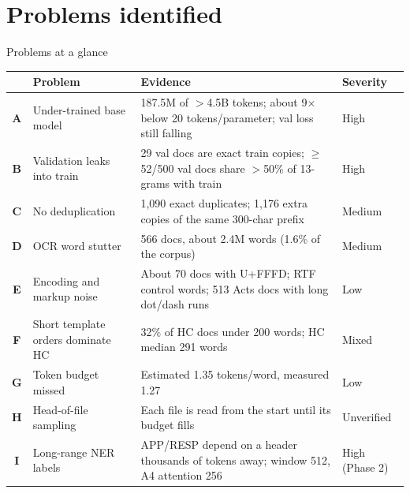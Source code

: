 \documentclass[aspectratio=169,11pt]{beamer}
\newcommand{\pb}[1]{\textbf{\textcolor{warm}{#1}}}   %
\begin{document}
\section{Problems identified}

\begin{frame}{Problems at a glance}
  \footnotesize
  \begin{tabularx}{\textwidth}{clXl}
    \toprule
    & Problem & Evidence & Severity \\
    \midrule
    \pb{A} & Under-trained base model & 187.5M of $>$4.5B tokens; about 9$\times$ below 20 tokens/parameter; val loss still falling & High \\
    \pb{B} & Validation leaks into train & 29 val docs are exact train copies; $\ge$52/500 val docs share $>$50\% of 13-grams with train & High \\
    \pb{C} & No deduplication & 1{,}090 exact duplicates; 1{,}176 extra copies of the same 300-char prefix & Medium \\
    \pb{D} & OCR word stutter & 566 docs, about 2.4M words (1.6\% of the corpus) & Medium \\
    \pb{E} & Encoding and markup noise & About 70 docs with U+FFFD; RTF control words; 513 Acts docs with long dot/dash runs & Low \\
    \pb{F} & Short template orders dominate HC & 32\% of HC docs under 200 words; HC median 291 words & Mixed \\
    \pb{G} & Token budget missed & Estimated 1.35 tokens/word, measured 1.27 & Low \\
    \pb{H} & Head-of-file sampling & Each file is read from the start until its budget fills & Unverified \\
    \pb{I} & Long-range NER labels & APP/RESP depend on a header thousands of tokens away; window 512, A4 attention 256 & High (Phase 2) \\
    \bottomrule
  \end{tabularx}
\end{frame}
\end{document}
